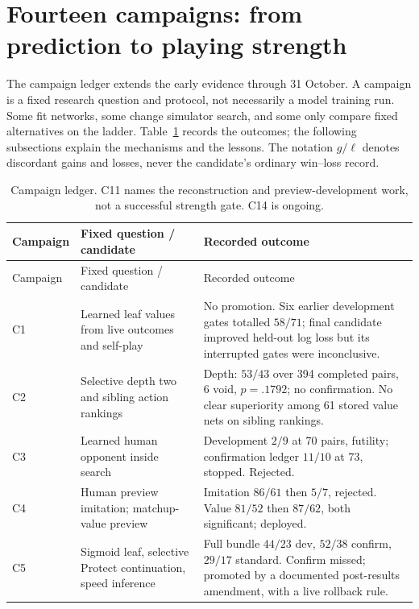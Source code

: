 \section{Fourteen campaigns: from prediction to playing strength}
\label{sec:campaigns}

The campaign ledger extends the early evidence through 31 October. A campaign
is a fixed research question and protocol, not necessarily a model training
run. Some fit networks, some change simulator search, and some only compare
fixed alternatives on the ladder. Table~\ref{tab:campaign-ledger} records the
outcomes; the following subsections explain the mechanisms and the lessons.
The notation $g/\ell$ denotes discordant gains and losses, never the candidate's
ordinary win--loss record.

\begin{small}
\begin{longtable}{>{\raggedright\arraybackslash}p{.10\linewidth}
  >{\raggedright\arraybackslash}p{.34\linewidth}
  >{\raggedright\arraybackslash}p{.47\linewidth}}
\caption{Campaign ledger. C11 names the reconstruction and preview-development
work, not a successful strength gate. C14 is ongoing.}\label{tab:campaign-ledger}\\
\toprule Campaign & Fixed question / candidate & Recorded outcome \\
\midrule\endfirsthead
\toprule Campaign & Fixed question / candidate & Recorded outcome \\
\midrule\endhead
C1 & Learned leaf values from live outcomes and self-play & No promotion.
Six earlier development gates totalled $58/71$; final candidate improved
held-out log loss but its interrupted gates were inconclusive. \\
C2 & Selective depth two and sibling action rankings & Depth: $53/43$ over
394 completed pairs, 6 void, $p=.1792$; no confirmation. No clear superiority
among 61 stored value nets on sibling rankings. \\
C3 & Learned human opponent inside search & Development $2/9$ at 70 pairs,
futility; confirmation ledger $11/10$ at 73, stopped. Rejected. \\
C4 & Human preview imitation; matchup-value preview & Imitation $86/61$ then
$5/7$, rejected. Value $81/52$ then $87/62$, both significant; deployed. \\
C5 & Sigmoid leaf, selective Protect continuation, speed inference & Full
bundle $44/23$ dev, $52/38$ confirm, $29/17$ standard. Confirm missed;
promoted by a documented post-results amendment, with a live rollback rule. \\

\end{longtable}
\end{small}
